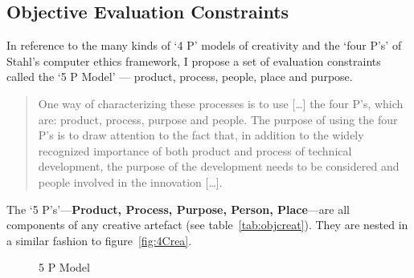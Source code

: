 \subsection{Objective Evaluation Constraints}
\label{s:oec}

In reference to the many kinds of `4 P' models of creativity and the `four P\rq s' of Stahl's computer ethics framework, I propose a set of evaluation constraints called the `5 P Model' --- product, process, people, place and purpose.

\begin{quotation}
  One way of characterizing these processes is to use [\ldots] the four P's, which are: product, process, purpose and people. The purpose of using the four P's is to draw attention to the fact that, in addition to the widely recognized importance of both product and process of technical development, the purpose of the development needs to be considered and people involved in the innovation [\ldots]. 
\end{quotation}

The `5 P\rq s'---\textbf{Product, Process, Purpose, Person, Place}---are all components of any creative artefact (see table~\ref{tab:objcreat}). They are nested in a similar fashion to figure~\ref{fig:4Crea}.

\begin{figure}[!htbp] %
  \centering
  \tikzset{every fit/.append style=text badly centered}
\caption[5 P Model]{5 P Model}
\label{fig:5PModel}
\end{figure}

